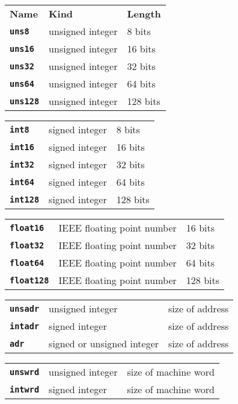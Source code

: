 \documentclass[12pt]{article}
\makeatletter
\newcommand{\TT}[1]{{\tt \bfseries #1}}
\newcommand{\ttkey}[1]{\TT{#1}\index{#1@{\tt #1}}}
\newenvironment{indpar}[1][0.3in]%
	{\begin{list}{}%
		     {\setlength{\itemsep}{0in}%
		      \setlength{\topsep}{0in}%
		      \setlength{\parsep}{1ex}%
		      \setlength{\labelwidth}{#1}%
		      \setlength{\leftmargin}{#1}%
		      \addtolength{\leftmargin}{\labelsep}}%
	 \item}%
	{\end{list}}
\makeatother
\begin{document}
\begin{indpar}
\begin{tabular}{p{1in}@{~~~~~~}p{2in}@{~~~~~~}l}
\bf Name & \bf Kind & \bf Length \\[2ex]
\ttkey{uns8}		& unsigned integer & 8 bits \\
\ttkey{uns16}		& unsigned integer & 16 bits \\
\ttkey{uns32}		& unsigned integer & 32 bits \\
\ttkey{uns64}		& unsigned integer & 64 bits \\
\ttkey{uns128}		& unsigned integer & 128 bits
\end{tabular}

\begin{tabular}{p{1in}@{~~~~~~}p{2in}@{~~~~~~}l}
\ttkey{int8}		& signed integer & 8 bits \\
\ttkey{int16}		& signed integer & 16 bits \\
\ttkey{int32}		& signed integer & 32 bits \\
\ttkey{int64}		& signed integer & 64 bits \\
\ttkey{int128}		& signed integer & 128 bits
\end{tabular}

\begin{tabular}{p{1in}@{~~~~~~}p{2in}@{~~~~~~}l}
\ttkey{float16}		& IEEE floating point number & 16 bits \\
\ttkey{float32}		& IEEE floating point number & 32 bits \\
\ttkey{float64}		& IEEE floating point number & 64 bits \\
\ttkey{float128}	& IEEE floating point number & 128 bits
\end{tabular}

\begin{tabular}{p{1in}@{~~~~~~}p{2in}@{~~~~~~}l}
\ttkey{unsadr}		& unsigned integer & size of address \\
\ttkey{intadr}		& signed integer & size of address \\
\ttkey{adr}		& signed or unsigned integer & size of address \\
\end{tabular}

\begin{tabular}{p{1in}@{~~~~~~}p{2in}@{~~~~~~}l}
\ttkey{unswrd}		& unsigned integer & size of machine word \\
\ttkey{intwrd}		& signed integer & size of machine word \\
\end{tabular}
\end{indpar}
\end{document}
